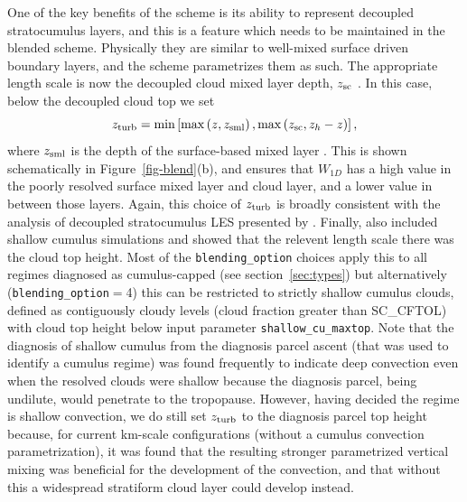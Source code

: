 \documentclass{UMDP_article}
\begin{document}
One of the key benefits of the \cite{lock00} scheme is its ability to
represent decoupled stratocumulus layers, and this is a feature which
needs to be maintained in the blended scheme. Physically they are
similar to well-mixed surface driven boundary layers, and the
\cite{lock00} scheme parametrizes them as such. The appropriate length
scale is now the decoupled cloud mixed layer depth, $z_{\rm sc}$
\cite[i.e.~the depth through which a negatively buoyant parcel
released at cloud top would descend,][]{lock01}. In this case, below
the decoupled cloud top we set
\begin{equation}\label{zturb_dsc}
  z_{\rm turb}=\min\left[\max\left(z,z_{\rm sml}\right),\max\left(z_{\rm sc},z_h-z\right)\right],
\end{equation}
where $z_{\rm sml}$ is the depth of the surface-based mixed layer
\cite[i.e.~the depth through which a positively buoyant parcel
released at the surface would ascend,][]{lock00}. This is shown
schematically in Figure~\ref{fig-blend}(b), and ensures that $W_{1D}$
has a high value in the poorly resolved surface mixed layer and cloud
layer, and a lower value in between those layers. Again, this choice
of $z_{\rm turb}$ is broadly consistent with the analysis of decoupled
stratocumulus LES presented by \cite{Malavelleetal2014}.  Finally, 
\cite{Honnertetal2011} also included shallow cumulus simulations and 
showed that the relevent length scale there was the cloud top height.  Most 
of the {\tt blending\_option} choices apply this to all regimes diagnosed 
as cumulus-capped (see section~\ref{sec:types}) but alternatively 
({\tt blending\_option}$=$4) this can be restricted to strictly shallow 
cumulus clouds, defined as contiguously cloudy levels (cloud fraction 
greater than SC\_CFTOL) with cloud top height below input parameter 
{\tt shallow\_cu\_maxtop}.  Note that the diagnosis of shallow cumulus 
from the diagnosis parcel ascent (that was used to identify a cumulus regime) 
was found frequently to indicate deep convection even when the resolved 
clouds were shallow because the diagnosis parcel, being undilute, would 
penetrate to the tropopause.  However, having decided the regime is shallow 
convection, we do still set $z_{\rm turb}$ to the diagnosis parcel top height 
because, for current km-scale configurations (without a cumulus convection 
parametrization), it was found that the resulting stronger parametrized 
vertical mixing was beneficial for the development of the convection, and 
that without this a widespread stratiform cloud layer could develop instead.
\end{document}
